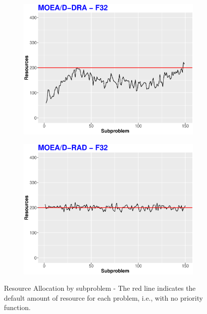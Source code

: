 \begin{figure}[!t]
	\centering
	\begin{subfigure}[b]{0.33\textwidth}
		\centering
		\includegraphics[width=1\textwidth, height=0.8\textwidth]{img/RA-DRA-32.eps}
	\end{subfigure}
	\begin{subfigure}[b]{0.33\textwidth}
		\centering
		\includegraphics[width=1\textwidth, height=0.8\textwidth]{img/RA-RAD-32.eps}
	\end{subfigure}
	\caption{Resource Allocation by subproblem - The red line indicates the default amount of resource for each problem, i.e., with no priority function.}
	\label{RAs2}
\end{figure}



